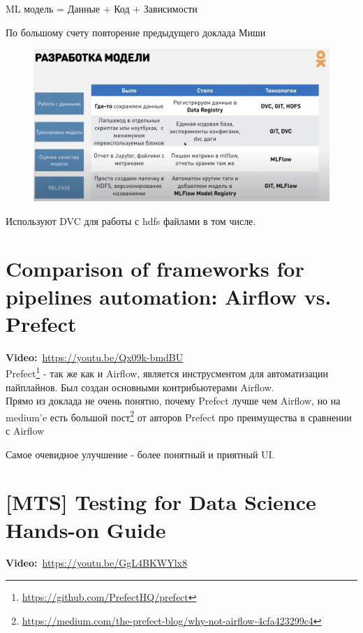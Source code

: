 \begin{center}
    ML модель = Данные + Код + Зависимости
\end{center}

По большому счету повторение предыдущего доклада Миши

\begin{figure}[ht]
    \centering
    \includegraphics[width=0.9\linewidth]{images/ok_repa.png}
    \label{fig:ok_repa}
\end{figure}

Используют DVC для работы с hdfs файлами в том числе.

\section{Comparison of frameworks for pipelines automation: Airflow vs. Prefect}

\textbf{Video:}~\url{https://youtu.be/Qx09k-bmdBU} \\

Prefect\footnote{\url{https://github.com/PrefectHQ/prefect}} - так же как и Airflow, является инструсментом для автоматизации пайплайнов.
Был создан основными контрибьютерами Airflow. \\

Прямо из доклада не очень понятно, почему Prefect лучше чем Airflow, но на medium'e есть большой пост\footnote{\url{https://medium.com/the-prefect-blog/why-not-airflow-4cfa423299c4}} от авторов Prefect про преимущества в сравнении с Airflow

Самое очевидное улучшение - более понятный и приятный UI.

\section{[MTS] Testing for Data Science Hands-on Guide}
\label{sec:testing_ds}

\textbf{Video:}~\url{https://youtu.be/GgL4BKWYlx8} 

